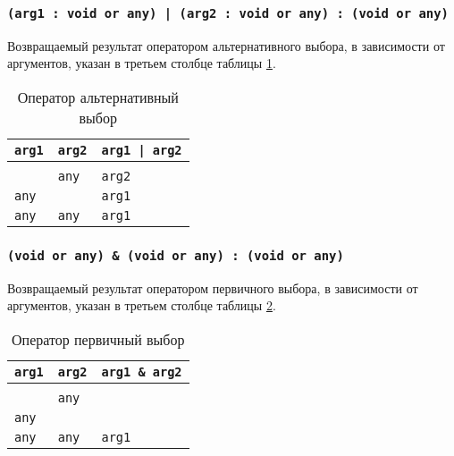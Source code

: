 \subsubsection{\texttt{(arg1 : void or any) | (arg2 : void or any) : (void or any)}}

Возвращаемый результат оператором альтернативного выбора, в зависимости от аргументов, указан в третьем столбце таблицы \ref{orhacktable}.

\begin{table}[htb]
	\caption{Оператор альтернативный выбор}
	\label{orhacktable}
	\begin{tabular}{|l|l|l|}
		\hline
		\texttt{arg1} & \texttt{arg2} & \texttt{arg1 | arg2} \\ \hline
		\void{}     & \void{}     & \void{}  			\\ \hline
		\void{}     & \texttt{any}  & \texttt{arg2}  		\\ \hline
		\texttt{any}  & \void{}     & \texttt{arg1}  		\\ \hline
		\texttt{any}  & \texttt{any}  & \texttt{arg1}  		\\ \hline
	\end{tabular}
	\vspace{0em}
\end{table}

\subsubsection{\texttt{(void or any) & (void or any) : (void or any)}}

Возвращаемый результат оператором первичного выбора, в зависимости от аргументов, указан в третьем столбце таблицы \ref{andhacktable}.

\begin{table}[htb]
	\caption{Оператор первичный выбор}
	\label{andhacktable}
	\begin{tabular}{|l|l|l|}
		\hline
		\texttt{arg1} & \texttt{arg2} & \texttt{arg1 \& arg2} \\ \hline
		\void{}     & \void{}     & \void{}   			\\ \hline
		\void{}     & \texttt{any}  & \void{}   			\\ \hline
		\texttt{any}  & \void{}     & \void{}   			\\ \hline
		\texttt{any}  & \texttt{any}  & \texttt{arg1}   		\\ \hline
	\end{tabular}
	\vspace{-2em}
\end{table}

